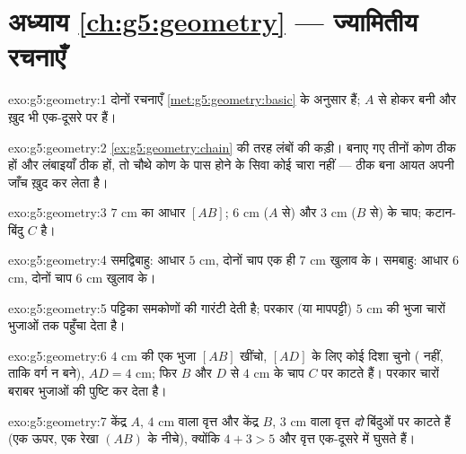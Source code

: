 \section*{अध्याय \ref{ch:g5:geometry} --- ज्यामितीय रचनाएँ}

\begin{solution}{exo:g5:geometry:1}
दोनों रचनाएँ \cref{met:g5:geometry:basic} के अनुसार हैं; $A$ से
होकर बनी  और  ख़ुद भी एक-दूसरे पर  हैं।
\end{solution}

\begin{solution}{exo:g5:geometry:2}
\cref{ex:g5:geometry:chain} की तरह लंबों की कड़ी। बनाए गए तीनों
कोण ठीक  हों और लंबाइयाँ ठीक हों, तो चौथे कोण के पास 
होने के सिवा कोई चारा नहीं --- ठीक बना आयत अपनी जाँच ख़ुद कर
लेता है।
\end{solution}

\begin{solution}{exo:g5:geometry:3}
$7$ cm का आधार $[AB]$; $6$ cm ($A$ से) और $3$ cm ($B$ से)
 के चाप; कटान-बिंदु $C$ है।
\end{solution}

\begin{solution}{exo:g5:geometry:4}
समद्विबाहु: आधार $5$ cm, दोनों चाप एक ही $7$ cm खुलाव के।
समबाहु: आधार $6$ cm, दोनों चाप $6$ cm खुलाव के।
\end{solution}

\begin{solution}{exo:g5:geometry:5}
 पट्टिका समकोणों की गारंटी देती है; परकार (या मापपट्टी)
$5$ cm की भुजा चारों भुजाओं तक पहुँचा देता है।
\end{solution}

\begin{solution}{exo:g5:geometry:6}
$4$ cm की एक भुजा $[AB]$ खींचो, $[AD]$ के लिए कोई दिशा चुनो (
नहीं, ताकि वर्ग न बने), $AD = 4$ cm; फिर $B$ और $D$ से $4$ cm के
चाप $C$ पर काटते हैं। परकार चारों बराबर भुजाओं की पुष्टि कर देता
है।
\end{solution}

\begin{solution}{exo:g5:geometry:7}
केंद्र $A$,  $4$ cm वाला वृत्त और केंद्र $B$, 
$3$ cm वाला वृत्त \emph{दो} बिंदुओं पर काटते हैं (एक ऊपर, एक
रेखा $(AB)$ के नीचे), क्योंकि $4 + 3 > 5$ और वृत्त एक-दूसरे में घुसते हैं।
\end{solution}

